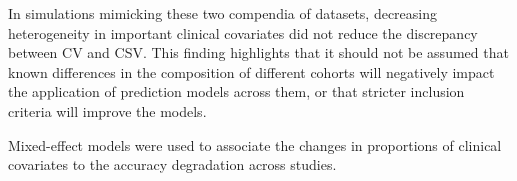 \documentclass{bioinfo}
\begin{document}
In simulations mimicking these two compendia of datasets, decreasing
heterogeneity in important clinical covariates %
did not reduce the
discrepancy between CV and CSV. %
This finding highlights that it should not be assumed that known
differences in the composition of different cohorts will negatively
impact the application of prediction models across them, or that
stricter inclusion criteria will improve the models.


Mixed-effect models were used to associate the changes 
in proportions of clinical covariates to the accuracy
degradation across studies. %
\end{document}
